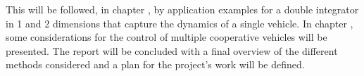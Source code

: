 This will be followed, in chapter , by application examples for a double integrator in 1 and 2 dimensions that capture the dynamics of a single vehicle. In chapter , some considerations for the control of multiple cooperative vehicles will be presented. The report will be concluded with a final overview of the different methods considered and a plan for the project's work will be defined.

